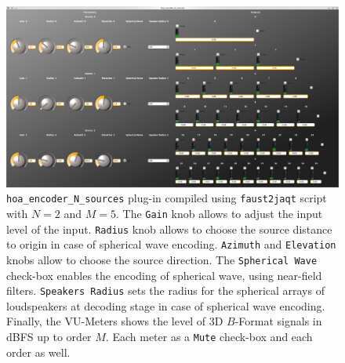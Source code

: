 \documentclass[10pt,a4paper]{article}
\begin{document}
\begin{figure}[!ht]
\includegraphics[width=\columnwidth]{hoa_encoder.png}
\caption{\lstinline'hoa_encoder_N_sources' plug-in compiled using \lstinline'faust2jaqt' script with $N=2$ and $M=5$. The \lstinline'Gain' knob allows to adjust the input level of the input. \lstinline'Radius' knob allows to choose the source distance to origin in case of spherical wave encoding. \lstinline'Azimuth' and \lstinline'Elevation' knobs allow to choose the source direction. The \lstinline'Spherical Wave' check-box enables the encoding of spherical wave, using near-field filters. \lstinline'Speakers Radius' sets the radius for the spherical arrays of loudspeakers at decoding stage in case of spherical wave encoding. Finally, the VU-Meters shows the level of 3D $B$-Format signals in dBFS up to order $M$. Each meter as a \lstinline'Mute' check-box and each order as well.}
\label{fig:hoa_encoder}
\end{figure}
\pagebreak
\end{document}
